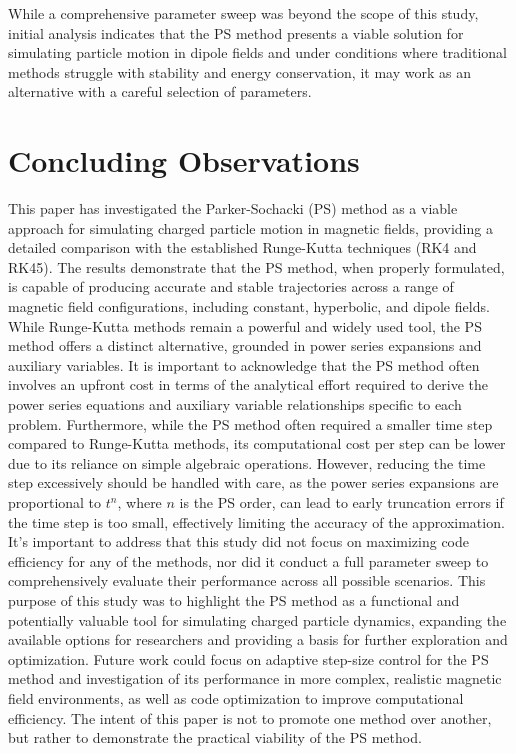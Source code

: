 \documentclass{article}
\begin{document}
While a comprehensive parameter sweep was beyond the scope of this study, initial analysis indicates that the PS method presents a viable solution for simulating particle motion in dipole fields and under conditions where traditional methods struggle with stability and energy conservation, it may work as an alternative with a careful selection of parameters.\\


\section{Concluding Observations}
This paper has investigated the Parker-Sochacki (PS) method as a viable approach for simulating charged particle motion in magnetic fields, providing a detailed comparison with the established Runge-Kutta techniques (RK4 and RK45). The results demonstrate that the PS method, when properly formulated, is capable of producing accurate and stable trajectories across a range of magnetic field configurations, including constant, hyperbolic, and dipole fields. While Runge-Kutta methods remain a powerful and widely used tool, the PS method offers a distinct alternative, grounded in power series expansions and auxiliary variables. It is important to acknowledge that the PS method often involves an upfront cost in terms of the analytical effort required to derive the power series equations and auxiliary variable relationships specific to each problem. Furthermore, while the PS method often required a smaller time step compared to Runge-Kutta methods, its computational cost per step can be lower due to its reliance on simple algebraic operations. However, reducing the time step excessively should be handled with care, as the power series expansions are proportional to $t^n$, where $n$ is the PS order, can lead to early truncation errors if the time step is too small, effectively limiting the accuracy of the approximation.\\

It's important to address that this study did not focus on maximizing code efficiency for any of the methods, nor did it conduct a full parameter sweep to comprehensively evaluate their performance across all possible scenarios. This purpose of this study was to highlight the PS method as a functional and potentially valuable tool for simulating charged particle dynamics, expanding the available options for researchers and providing a basis for further exploration and optimization. Future work could focus on adaptive step-size control for the PS method and investigation of its performance in more complex, realistic magnetic field environments, as well as code optimization to improve computational efficiency. The intent of this paper is not to promote one method over another, but rather to demonstrate the practical viability of the PS method.


\pagebreak
\printbibliography
\end{document}
